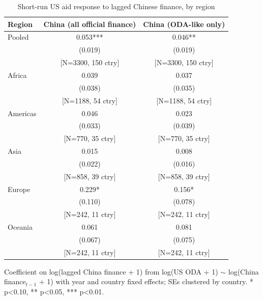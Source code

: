 \begin{table}[htbp]
\centering
\caption{Short-run US aid response to lagged Chinese finance, by region}
\label{tab:main}
\begin{tabular}{lcc}
\toprule
Region & China (all official finance) & China (ODA-like only) \\
\midrule
Pooled & 0.053*** & 0.046** \\
 & (0.019) & (0.019) \\
 & [N=3300, 150 ctry] & [N=3300, 150 ctry] \\[2pt]
Africa & 0.039 & 0.037 \\
 & (0.038) & (0.035) \\
 & [N=1188, 54 ctry] & [N=1188, 54 ctry] \\[2pt]
Americas & 0.046 & 0.023 \\
 & (0.033) & (0.039) \\
 & [N=770, 35 ctry] & [N=770, 35 ctry] \\[2pt]
Asia & 0.015 & 0.008 \\
 & (0.022) & (0.016) \\
 & [N=858, 39 ctry] & [N=858, 39 ctry] \\[2pt]
Europe & 0.229* & 0.156* \\
 & (0.110) & (0.078) \\
 & [N=242, 11 ctry] & [N=242, 11 ctry] \\[2pt]
Oceania & 0.061 & 0.081 \\
 & (0.067) & (0.075) \\
 & [N=242, 11 ctry] & [N=242, 11 ctry] \\[2pt]
\bottomrule
\end{tabular}
\begin{minipage}{0.9\textwidth}
\vspace{4pt}
\footnotesize Coefficient on log(lagged China finance + 1) from
log(US ODA + 1) $\sim$ log(China finance$_{t-1}$ + 1) with year and
country fixed effects; SEs clustered by country. * p<0.10, ** p<0.05, *** p<0.01.
\end{minipage}
\end{table}
